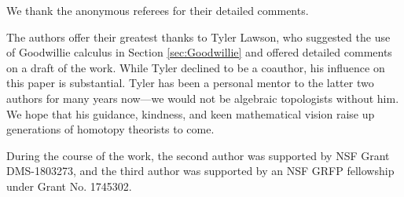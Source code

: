 We thank the anonymous referees for their detailed comments.

The authors offer their greatest thanks to Tyler Lawson, who suggested the use of Goodwillie calculus in Section \ref{sec:Goodwillie} and offered detailed comments on a draft of the work.
While Tyler declined to be a coauthor, his influence on this paper is substantial. Tyler has been a personal mentor to the latter two authors for many years now---we would not be algebraic topologists without him.
We hope that his guidance, kindness, and keen mathematical vision raise up generations of homotopy theorists to come.

During the course of the work, the second author was supported by NSF Grant DMS-1803273, and the third author was supported by an NSF GRFP fellowship under Grant No. 1745302.

